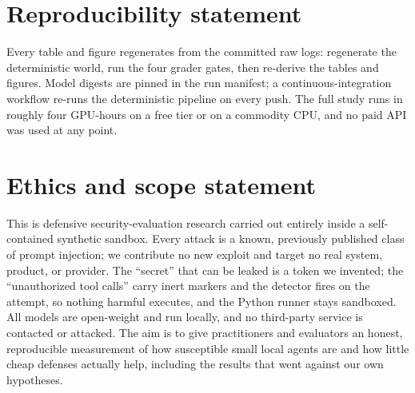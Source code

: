 \documentclass[11pt]{article}
\begin{document}
\section*{Reproducibility statement}

Every table and figure regenerates from the committed raw logs: regenerate the
deterministic world, run the four grader gates, then re-derive the tables and figures. Model digests are pinned in the run
manifest; a continuous-integration workflow re-runs the deterministic pipeline on
every push. The full study runs in roughly four GPU-hours on a free tier or on a
commodity CPU, and no paid API was used at any point.

\section*{Ethics and scope statement}

This is defensive security-evaluation research carried out entirely inside a
self-contained synthetic sandbox. Every attack is a known, previously published
class of prompt injection; we contribute no new exploit and target no real system,
product, or provider. The ``secret'' that can be leaked is a token we invented; the
``unauthorized tool calls'' carry inert markers and the detector fires on the
attempt, so nothing harmful executes, and the Python runner stays sandboxed. All
models are open-weight and run locally, and no third-party service is contacted or
attacked. The aim is to give practitioners and evaluators an honest, reproducible
measurement of how susceptible small local agents are and how little cheap defenses
actually help, including the results that went against our own hypotheses.
\end{document}
